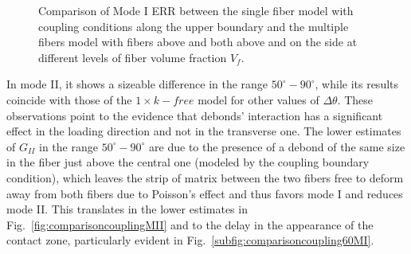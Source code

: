 \documentclass[review]{elsarticle}
\begin{document}
\begin{figure}[!h]
\caption{Comparison of Mode I ERR between the single fiber model with coupling conditions along the upper boundary and the multiple fibers model with fibers above and both above and on the side at different levels of fiber volume fraction $V_{f}$.}\label{fig:comparisoncouplingMI}
\end{figure}

In mode II, it shows a sizeable difference in the range $50^{\circ}-90^{\circ}$, while its results coincide with those of the $1\times k-free$ model for other values of $\Delta\theta$. These observations point to the evidence that debonds' interaction has a significant effect in the loading direction and not in the transverse one. The lower estimates of $G_{II}$ in the range  $50^{\circ}-90^{\circ}$ are due to the presence of a debond of the same size in the fiber just above the central one (modeled by the coupling boundary condition), which leaves the strip of matrix between the two fibers free to deform away from both fibers due to Poisson's effect and thus favors mode I and reduces mode II. This translates in the lower estimates in Fig.~\ref{fig:comparisoncouplingMII} and to the delay in the appearance of the contact zone, particularly evident in Fig.~\ref{subfig:comparisoncoupling60MI}.
\end{document}
